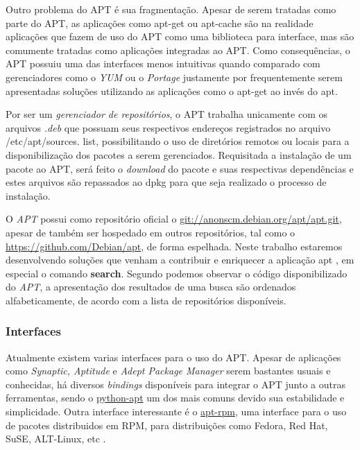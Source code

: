 Outro problema do APT é sua fragmentação. Apesar de serem tratadas como parte do APT, as aplicações como {\code apt-get} ou {\code apt-cache} são na realidade aplicações que fazem de uso do APT como uma biblioteca para interface, mas são comumente tratadas como aplicações integradas ao APT. Como consequências, o APT possuiu uma das interfaces menos intuitivas quando comparado com gerenciadores como o \textit{YUM} ou o \textit{Portage} justamente por frequentemente serem apresentadas soluções utilizando as aplicações como o {\code apt-get} ao invés do {\code apt}.

Por ser um \textit{gerenciador de repositórios}, o {\code APT} trabalha unicamente com os arquivos \textit{.deb} que possuam seus respectivos endereços registrados no arquivo {\code/etc/apt/sources. list}, possibilitando o uso de diretórios remotos ou locais para a disponibilização dos pacotes a serem gerenciados. Requisitada a instalação de um pacote ao {\code APT}, será feito o \textit{download} do pacote e  suas respectivas dependências e estes arquivos são repassados ao {\code dpkg} para que seja realizado o processo de instalação.

O \textit{APT} possui como repositório oficial o \url{git://anonscm.debian.org/apt/apt.git}, apesar de também ser hospedado em outros repositórios, tal como o \url{https://github.com/Debian/apt}, de forma espelhada. Neste trabalho estaremos desenvolvendo soluções que venham a contribuir e enriquecer a aplicação 
{\code apt}
, em especial o comando \textbf{search}. Segundo podemos observar o código disponibilizado do \textit{APT}, a apresentação dos resultados de uma busca são ordenados alfabeticamente, de acordo com a lista de repositórios disponíveis.


\subsubsection*{Interfaces} %
\label{ssub:interfaces}
Atualmente existem varias interfaces para o uso do APT. Apesar de aplicações como \textit{Synaptic, Aptitude} e \textit{Adept Package Manager} serem bastantes usuais e conhecidas, há diversos \textit{bindings} disponíveis para integrar o APT junto a outras ferramentas, sendo o \href{https://apt.alioth.debian.org/python-apt-doc/library/index.html}{python-apt} um dos mais comuns  devido sua estabilidade e simplicidade. Outra interface interessante é o \href{http://apt-rpm.org/about.shtml}{apt-rpm}, uma interface para o uso de pacotes distribuidos em RPM, para distribuições como Fedora, Red Hat, SuSE, ALT-Linux, etc \cite{apt-rpm}.

